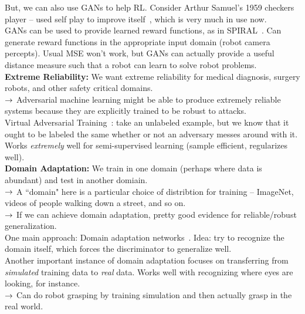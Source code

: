 But, we can also use GANs to help RL. Consider Arthur Samuel's 1959 checkers player -- used self play to improve itself~\cite{brock2018large}, which is very much in use now. \\

GANs can be used to provide learned reward functions, as in SPIRAL~\cite{ganin2018synthesizing}. Can generate reward functions in the appropriate input domain (robot camera percepts). Usual MSE won't work, but GANs can actually provide a useful distance measure such that a robot can learn to solve robot problems. \\

{\bf Extreme Reliability:} We want extreme reliability for medical diagnosis, surgery robots, and other safety critical domains. \\

$\rightarrow$ Adversarial machine learning might be able to produce extremely reliable systems because they are explicitly trained to be robust to attacks. \\

Virtual Adversarial Training~\cite{miyato2018virtual}: take an unlabeled example, but we know that it ought to be labeled the same whether or not an adversary messes around with it. Works {\it extremely} well for semi-supervised learning (sample efficient, regularizes well). \\

{\bf Domain Adaptation:} We train in one domain (perhaps where data is abundant) and test in another domiain. \\

$\rightarrow$ A ``domain" here is a particular choice of distribtion for training -- ImageNet, videos of people walking down a street, and so on. \\

$\rightarrow$ If we can achieve domain adaptation, pretty good evidence for reliable/robust generalization. \\

One main approach: Domain adaptation networks~\cite{ganin2016domain}. Idea: try to recognize the domain itself, which forces the discriminator to generalize well. \\

Another important instance of domain adaptation focuses on transferring from {\it simulated} training data to {\it real} data. Works well with recognizing where eyes are looking, for instance. \\

$\rightarrow$ Can do robot grasping by training simulation and then actually grasp in the real world.\\

